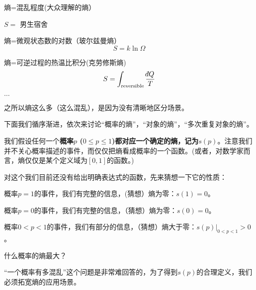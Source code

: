 \documentclass[CJK]{beamer}
\begin{document}
\begin{frame}
\bch
\bitem
\item{熵=混乱程度(大众理解的熵）

\begin{center}
$S=$ 男生宿舍
\end{center}
}
\item{熵=微观状态数的对数（玻尔兹曼熵）
$$S = k\ln \Omega$$
}
\item{熵=可逆过程的热温比积分(克劳修斯熵)
$$S = \int_{\rm reversible} \frac{\dbar Q}{T}$$
}
\item{$\ldots$}
\eitem

之所以熵这么多（这么混乱），是因为没有清晰地区分场景。

下面我们循序渐进，依次来讨论“概率的熵”，“对象的熵”，“多次重复对象的熵”。
\ech
\end{frame}

\begin{frame}
\bch
我们假设任何一个{\blue \bf 概率$p$ ($0\le p\le 1$)都对应一个确定的熵，记为$s(p)$}。注意我们并不关心概率描述的事件，而仅仅把熵看成概率的一个函数。(或者，对数学家而言，熵仅仅是某个定义域为$[0,1]$的函数。)

\skipline

对这个我们目前还没有给出明确表达式的函数，先来猜想一下它的性质：

\bitem
\item{概率$p=1$的事件，我们有完整的信息，(猜想）熵为零：$s(1) = 0$。}
\item{概率$p=0$的事件，我们有完整的信息，（猜想）熵为零：$s(0) = 0$。}
\item{概率$0<p<1$的事件，我们有部分的信息，（猜想）熵大于零：$s(p)|_{0<p<1} > 0$。}
\eitem

\ech
\end{frame}


\begin{frame}
\bch
{}
什么概率的熵最大？

\ech
\end{frame}


\begin{frame}
\bch

“一个概率有多混乱”这个问题是非常难回答的，为了得到$s(p)$的合理定义，我们必须拓宽熵的应用场景。

\ech
\end{frame}
\end{document}

